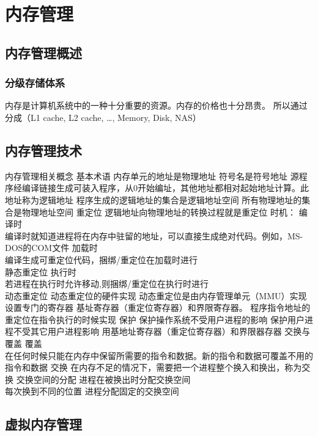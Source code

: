 \documentclass{ctexart}
\begin{document}
\section{内存管理}
\subsection{内存管理概述}
\subsubsection{分级存储体系}
内存是计算机系统中的一种十分重要的资源。内存的价格也十分昂贵。
所以通过分成（L1 cache, L2 cache, \dots, Memory, Disk, NAS）

\subsection{内存管理技术}
\begin{outline}
    \1 内存管理相关概念
        \2 基本术语
            \3 内存单元的地址是物理地址
            \3 符号名是符号地址
            \3 源程序经编译链接生成可装入程序，从0开始编址，其他地址都相对起始地址计算。此地址称为逻辑地址
            \3 程序生成的逻辑地址的集合是逻辑地址空间
            \3 所有物理地址的集合是物理地址空间
        \2 重定位
            \3 逻辑地址向物理地址的转换过程就是重定位
            \3 时机：
                \4 编译时 \\
                编译时就知道进程将在内存中驻留的地址，可以直接生成绝对代码。例如，MS-DOS的COM文件
                \4 加载时 \\
                编译生成可重定位代码，捆绑/重定位在加载时进行 \\
                静态重定位
                \4 执行时 \\
                若进程在执行时允许移动,则捆绑/重定位在执行时进行 \\
                动态重定位
        \2 动态重定位的硬件实现
            \3 动态重定位是由内存管理单元（MMU）实现
            \3 设置专门的寄存器
            \3 基址寄存器（重定位寄存器）和界限寄存器。
            \3 程序指令地址的重定位在指令执行的时候实现
        \2 保护
            \3 保护操作系统不受用户进程的影响
            \3 保护用户进程不受其它用户进程影响
            \3 用基地址寄存器（重定位寄存器）和界限器存器
    \1 交换与覆盖
        \2 覆盖 \\
        在任何时候只能在内存中保留所需要的指令和数据。新的指令和数据可覆盖不用的指令和数据
        \2 交换
            \3 在内存不足的情况下，需要把一个进程整个换入和换出，称为交换
            \3 交换空间的分配
                \4 进程在被换出时分配交换空间 \\
                每次换到不同的位置
                \4 进程分配固定的交换空间
                


\end{outline}
\subsection{虚拟内存管理}
\end{document}
